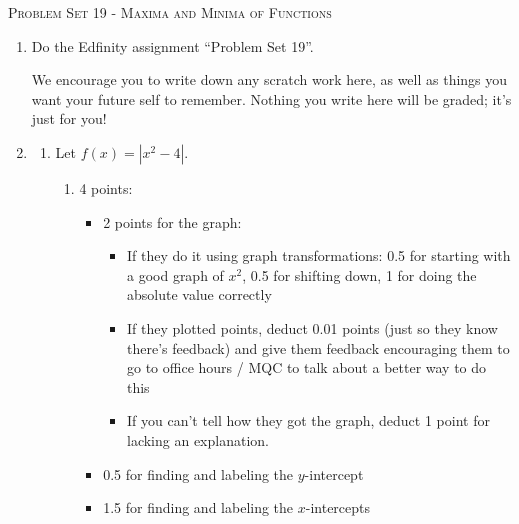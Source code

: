 \documentclass{article}
\newcommand{\doedfinity}[2][\newpage]{
  \begin{problem}[#1]
    Do the Edfinity assignment ``Problem Set #2''.

    We encourage you to write down any scratch work here, as well as
    things you want your future self to remember. Nothing you write
    here will be graded; it's just for you!
  \end{problem}
}
\begin{document}
\begin{center}
  \large\textsc{Problem Set 19 - Maxima and Minima of Functions}
\end{center}

\begin{enumerate}
\item  {}

  \doedfinity{19}

\item    
  \begin{enumerate}
  \item Let $f(x) = |x^2 - 4|$.

    \begin{enumerate}
    \item

      \begin{grading}
        4 points:
        \begin{itemize}[nosep]
        \item 2 points for the graph:
          \begin{itemize}[nosep]
          \item If they do it using graph transformations: 0.5 for starting with a good graph of $x^2$, 0.5 for shifting down, 1 for doing the absolute value correctly
          \item If they plotted points, deduct 0.01 points (just so they know there's feedback) and give them feedback encouraging them to go to office hours / MQC to talk about a better way to do this
          \item If you can't tell how they got the graph, deduct 1 point for lacking an explanation. 
          \end{itemize}
        \item 0.5 for finding and labeling the $y$-intercept
        \item 1.5 for finding and labeling the $x$-intercepts
        \end{itemize}
      \end{grading}


\end{enumerate}
\end{enumerate}
\end{enumerate}
\end{document}
